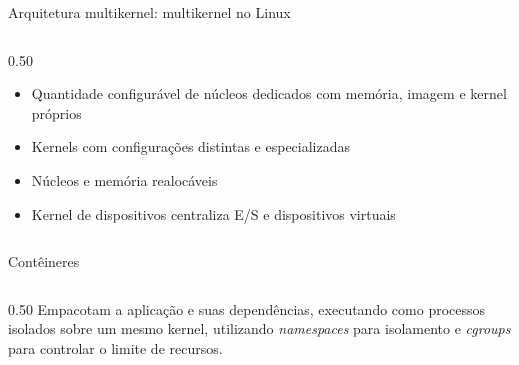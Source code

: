 \documentclass[aspectratio=169]{beamer}
\begin{document}
{\begin{frame}{Arquitetura multikernel: multikernel no Linux}
\begin{columns}[c]
\begin{column}{0.50\textwidth}
\begin{itemize}
                        \item Quantidade configurável de núcleos dedicados com memória, imagem e kernel próprios
                        \item Kernels com configurações distintas e especializadas
                        \item Núcleos e memória realocáveis
                        \item Kernel de dispositivos centraliza E/S e dispositivos virtuais
                    \end{itemize}
                    \vspace{1mm}
                \end{column}
            \end{columns}
        \end{frame}

        \begin{frame}{Contêineres}
            \begin{columns}[c]
                \begin{column}{0.50\textwidth}
                    \small Empacotam a aplicação e suas dependências, executando como processos isolados sobre um mesmo kernel,
                                  utilizando \textit{namespaces} para isolamento e \textit{cgroups} para controlar o limite de recursos.


\end{column}
\end{columns}
\end{frame}}
\end{document}
